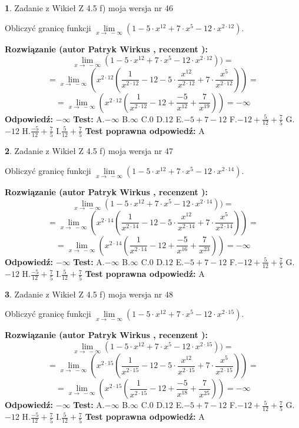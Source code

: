 \documentclass[12pt, a4paper]{article}
\theoremstyle{definition} %
\newtheorem{zad}{}
\newcommand{\zadStart}[1]{\begin{zad}#1\newline}
\newcommand{\zadStop}{\end{zad}}
\newcommand{\rozwStart}[2]{\noindent \textbf{Rozwiązanie (autor #1 , recenzent #2): }\newline}
\newcommand{\rozwStop}{\newline}
\newcommand{\odpStart}{\noindent \textbf{Odpowiedź:}\newline}
\newcommand{\odpStop}{\newline}
\newcommand{\testStart}{\noindent \textbf{Test:}\newline}
\newcommand{\testStop}{\newline}
\newcommand{\kluczStart}{\noindent \textbf{Test poprawna odpowiedź:}\newline}
\newcommand{\kluczStop}{\newline}
\begin{document}
\zadStart{Zadanie z Wikieł Z 4.5 f) moja wersja nr 46}



Obliczyć granicę funkcji  $\lim\limits_{x\to\ -\infty}(1 - 5 \cdot x^{12}+7 \cdot x^{5}- 12 \cdot x^{2\cdot12})$.
\zadStop
\rozwStart{Patryk Wirkus}{}
$$\lim\limits_{x\to\ -\infty}(1 - 5 \cdot x^{12}+7 \cdot x^{5}- 12 \cdot x^{2\cdot12}))=$$
$$=\lim\limits_{x\to\ -\infty}(x^{2\cdot12}(\frac{1}{x^{2\cdot12}}-12 -5 \cdot \frac{x^{12}}{x^{2\cdot12}}+7 \cdot \frac{x^{5}}{x^{2\cdot12}}))=$$
$$=\lim\limits_{x\to\ -\infty}(x^{2\cdot12}(\frac{1}{x^{2\cdot12}}-12 + \frac{-5}{x^{12}}+ \frac{7}{x^{19}}))=-\infty$$
\rozwStop
\odpStart
$-\infty$
\odpStop
\testStart
A.$-\infty$ B.$\infty$ C.$0$ D.$12$ E.$-5 + 7 - 12$
F.$-12+\frac{5}{12}+\frac{7}{5}$ G.$-12$
H.$\frac{-5}{12}+\frac{7}{5}$
I.$\frac{5}{12}+\frac{7}{5}$
\testStop
\kluczStart
A
\kluczStop



\zadStart{Zadanie z Wikieł Z 4.5 f) moja wersja nr 47}



Obliczyć granicę funkcji  $\lim\limits_{x\to\ -\infty}(1 - 5 \cdot x^{12}+7 \cdot x^{5}- 12 \cdot x^{2\cdot14})$.
\zadStop
\rozwStart{Patryk Wirkus}{}
$$\lim\limits_{x\to\ -\infty}(1 - 5 \cdot x^{12}+7 \cdot x^{5}- 12 \cdot x^{2\cdot14}))=$$
$$=\lim\limits_{x\to\ -\infty}(x^{2\cdot14}(\frac{1}{x^{2\cdot14}}-12 -5 \cdot \frac{x^{12}}{x^{2\cdot14}}+7 \cdot \frac{x^{5}}{x^{2\cdot14}}))=$$
$$=\lim\limits_{x\to\ -\infty}(x^{2\cdot14}(\frac{1}{x^{2\cdot14}}-12 + \frac{-5}{x^{16}}+ \frac{7}{x^{23}}))=-\infty$$
\rozwStop
\odpStart
$-\infty$
\odpStop
\testStart
A.$-\infty$ B.$\infty$ C.$0$ D.$12$ E.$-5 + 7 - 12$
F.$-12+\frac{5}{12}+\frac{7}{5}$ G.$-12$
H.$\frac{-5}{12}+\frac{7}{5}$
I.$\frac{5}{12}+\frac{7}{5}$
\testStop
\kluczStart
A
\kluczStop



\zadStart{Zadanie z Wikieł Z 4.5 f) moja wersja nr 48}



Obliczyć granicę funkcji  $\lim\limits_{x\to\ -\infty}(1 - 5 \cdot x^{12}+7 \cdot x^{5}- 12 \cdot x^{2\cdot15})$.
\zadStop
\rozwStart{Patryk Wirkus}{}
$$\lim\limits_{x\to\ -\infty}(1 - 5 \cdot x^{12}+7 \cdot x^{5}- 12 \cdot x^{2\cdot15}))=$$
$$=\lim\limits_{x\to\ -\infty}(x^{2\cdot15}(\frac{1}{x^{2\cdot15}}-12 -5 \cdot \frac{x^{12}}{x^{2\cdot15}}+7 \cdot \frac{x^{5}}{x^{2\cdot15}}))=$$
$$=\lim\limits_{x\to\ -\infty}(x^{2\cdot15}(\frac{1}{x^{2\cdot15}}-12 + \frac{-5}{x^{18}}+ \frac{7}{x^{25}}))=-\infty$$
\rozwStop
\odpStart
$-\infty$
\odpStop
\testStart
A.$-\infty$ B.$\infty$ C.$0$ D.$12$ E.$-5 + 7 - 12$
F.$-12+\frac{5}{12}+\frac{7}{5}$ G.$-12$
H.$\frac{-5}{12}+\frac{7}{5}$
I.$\frac{5}{12}+\frac{7}{5}$
\testStop
\kluczStart
A
\kluczStop
\end{document}
